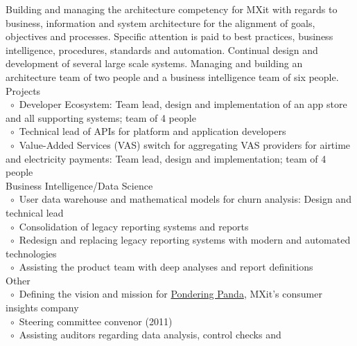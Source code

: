 \documentclass[10pt,a4paper,final]{columncv}
\newcommand{\cvitembullet}{~$\circ$~}
\newcommand{\cvitempbullet}{\phantom{\cvitembullet}}
\begin{document}
\begin{cvenv}
  \cvitem{}{} %
  
         {Building and managing the architecture competency for MXit with regards to 
         business, information and system architecture for the alignment of goals, 
         objectives and processes. Specific attention is paid to best practices, business 
         intelligence, procedures, standards and automation. Continual design and 
         development of several large scale systems. Managing and building an architecture
         team of two people and a business intelligence team of six people.}
        {Projects \\
         \cvitembullet Developer Ecosystem: Team lead, design and implementation 
         \cvitempbullet of an app store and all supporting systems; team of 4 people \\
         \cvitembullet Technical lead of APIs for platform and application developers \\
         \cvitembullet Value-Added Services (VAS) switch for aggregating VAS providers 
         \cvitempbullet for airtime and electricity payments: Team lead, design and 
         \cvitempbullet implementation; team of 4 people \\
         Business Intelligence/Data Science \\
         \cvitembullet User data warehouse and mathematical models for churn analysis: 
         \cvitempbullet Design and technical lead \\
         \cvitembullet Consolidation of legacy reporting systems and reports \\
         \cvitembullet Redesign and replacing legacy reporting systems with modern and 
         \cvitempbullet automated technologies \\
         \cvitembullet Assisting the product team with deep analyses and report 
         \cvitempbullet definitions \\
         Other \\
         \cvitembullet Defining the vision and mission for \href{http://www.ponderingpanda.com/}{Pondering Panda}, MXit's
         \cvitempbullet consumer insights company \\
         \cvitembullet Steering committee convenor (2011) \\
         \cvitembullet Assisting auditors regarding data analysis, control checks and 
}
\end{cvenv}
\end{document}
